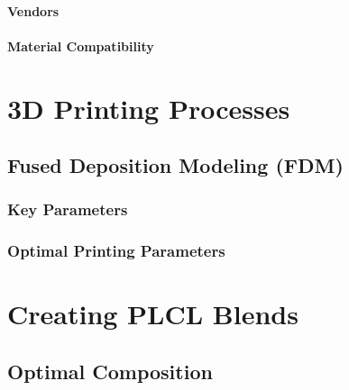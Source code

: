 \paragraph*{Vendors}

\paragraph*{Material Compatibility}

\section{3D Printing Processes\label{sec:literatureReview:3dPrinting}}

\subsection{Fused Deposition Modeling (FDM)\label{sec:literatureReview:3dPrinting:FDM}}

\subsubsection{Key Parameters\label{sec:literatureReview:3dPrinting:parameters}}

\subsubsection{Optimal Printing Parameters\label{sec:literatureReview:3dPrinting:optimalParameters}}

\section{Creating PLCL Blends\label{sec:literatureReview:PLCL}}

\subsection{Optimal Composition\label{sec:literatureReview:PLCL:composition}}

